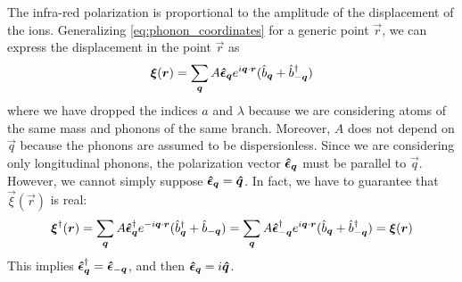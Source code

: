 The infra-red polarization is proportional to the amplitude of the displacement of the ions. Generalizing \cref{eq:phonon_coordinates} for a generic point $\vec{r}$, we can express the displacement in the point $\vec{r}$ as
\begin{equation}
    \vec{\xi}(\vec{r}) = \sum_{\vec{q}} A \vers{\epsilon}_{\vec{q}} e^{i\vec{q} \cdot \vec{r}} (\oper{b}_{\vec{q}} + \adjop{b}_{-\vec{q}})
\end{equation}
where we have dropped the indices $a$ and $\lambda$ because we are considering atoms of the same mass and phonons of the same branch. Moreover, $A$ does not depend on $\vec{q}$ because the phonons are assumed to be dispersionless. Since we are considering only longitudinal phonons, the polarization vector $\vers{\epsilon}_{\vec{q}}$ must be parallel to $\vec{q}$. However, we cannot simply suppose $\vers{\epsilon}_{\vec{q}} = \vers{q}$. In fact, we have to guarantee that $\vec{\xi}(\vec{r})$ is real:
\begin{equation}
    \vec{\xi}^\dagger(\vec{r}) = \sum_{\vec{q}} A \vers{\epsilon}_{\vec{q}}^\dagger e^{-i\vec{q} \cdot \vec{r}} (\adjop{b}_{\vec{q}} + \oper{b}_{-\vec{q}})
    = \sum_{\vec{q}} A \vers{\epsilon}_{-\vec{q}}^\dagger e^{i\vec{q} \cdot \vec{r}} (\oper{b}_{\vec{q}} + \adjop{b}_{-\vec{q}})
    = \vec{\xi}(\vec{r})
\end{equation}
This implies $\vers{\epsilon}_{\vec{q}}^\dagger = \vers{\epsilon}_{-\vec{q}}$, and then $\vers{\epsilon}_{\vec{q}} = i\vers{q}$.

